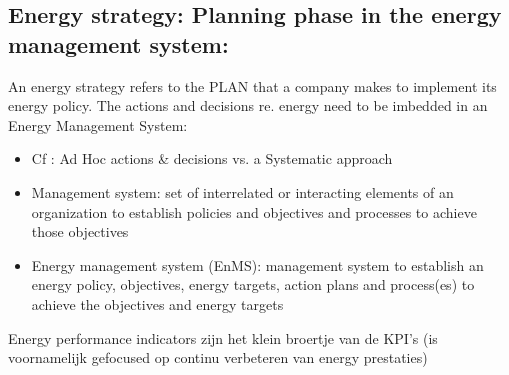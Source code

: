 \documentclass[12pt]{article}
\begin{document}
\subsection{Energy strategy: Planning phase in the energy management system:}
An energy strategy refers to the PLAN that a company makes
to implement its energy policy.
The actions and decisions re. energy need to be imbedded in
an Energy Management System:\begin{itemize}
    \item Cf : Ad Hoc actions \& decisions vs. a Systematic
    approach
    \item Management system: set of interrelated or interacting elements of an
    organization to establish policies and objectives and
    processes to achieve those objectives
    \item Energy management system (EnMS): management system to establish an energy policy,
    objectives, energy targets, action plans and process(es) to
    achieve the objectives and energy targets
\end{itemize}
Energy performance indicators zijn het klein broertje van de KPI's (is voornamelijk gefocused op continu verbeteren van energy prestaties)
\end{document}
